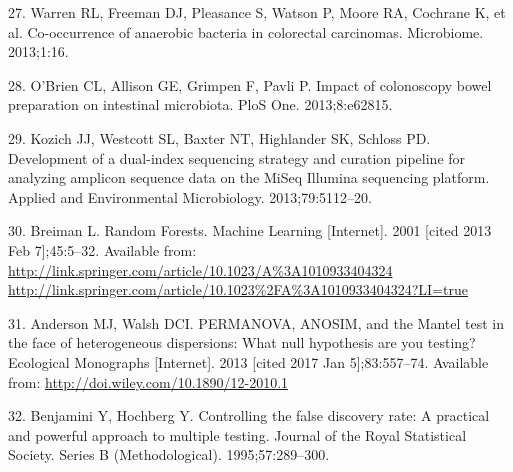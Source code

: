 \documentclass[12pt,]{article}
\begin{document}
\hypertarget{ref-warren_co-occurrence_2013}{}
27. Warren RL, Freeman DJ, Pleasance S, Watson P, Moore RA, Cochrane K,
et al. Co-occurrence of anaerobic bacteria in colorectal carcinomas.
Microbiome. 2013;1:16.

\hypertarget{ref-obrien_impact_2013}{}
28. O'Brien CL, Allison GE, Grimpen F, Pavli P. Impact of colonoscopy
bowel preparation on intestinal microbiota. PloS One. 2013;8:e62815.

\hypertarget{ref-kozich_development_2013}{}
29. Kozich JJ, Westcott SL, Baxter NT, Highlander SK, Schloss PD.
Development of a dual-index sequencing strategy and curation pipeline
for analyzing amplicon sequence data on the MiSeq Illumina sequencing
platform. Applied and Environmental Microbiology. 2013;79:5112--20.

\hypertarget{ref-breiman_random_2001}{}
30. Breiman L. Random Forests. Machine Learning {[}Internet{]}. 2001
{[}cited 2013 Feb 7{]};45:5--32. Available from:
\href{http://link.springer.com/article/10.1023/A\%3A1010933404324\%20http://link.springer.com/article/10.1023\%2FA\%3A1010933404324?LI=true}{http://link.springer.com/article/10.1023/A\%3A1010933404324 http://link.springer.com/article/10.1023\%2FA\%3A1010933404324?LI=true}

\hypertarget{ref-anderson_permanova_2013}{}
31. Anderson MJ, Walsh DCI. PERMANOVA, ANOSIM, and the Mantel test in
the face of heterogeneous dispersions: What null hypothesis are you
testing? Ecological Monographs {[}Internet{]}. 2013 {[}cited 2017 Jan
5{]};83:557--74. Available from:
\url{http://doi.wiley.com/10.1890/12-2010.1}

\hypertarget{ref-benjamini_controlling_1995}{}
32. Benjamini Y, Hochberg Y. Controlling the false discovery rate: A
practical and powerful approach to multiple testing. Journal of the
Royal Statistical Society. Series B (Methodological). 1995;57:289--300.
\end{document}

